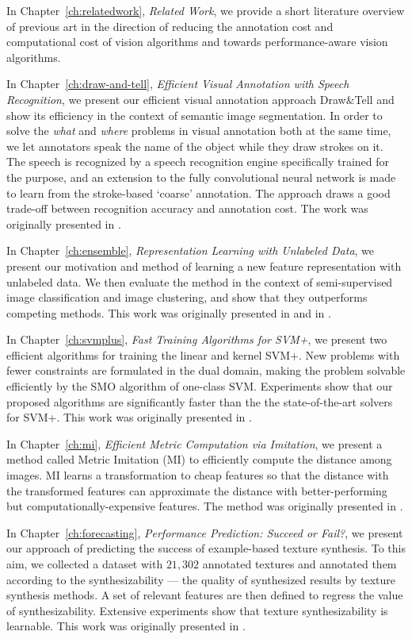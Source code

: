 In Chapter~\ref{ch:relatedwork}, \emph{Related Work}, we provide a short literature overview of previous art in the direction of  reducing the annotation cost and computational cost of vision algorithms and towards performance-aware vision algorithms. 

In Chapter~\ref{ch:draw-and-tell}, \emph{Efficient Visual Annotation with Speech Recognition}, we present our efficient visual annotation approach Draw\&Tell and show its efficiency in the context of semantic image segmentation. In order to solve the \emph{what} and \emph{where} problems in visual annotation both at the same time, we let annotators speak the name of the object  while they draw strokes on it.  The speech is recognized by a speech recognition engine specifically trained for the purpose, and an extension to the fully convolutional neural network is made to learn from the stroke-based `coarse' annotation.  The approach draws a good trade-off between recognition accuracy and annotation cost.  The work was originally presented in \citep{draw:tell}. 

In Chapter~\ref{ch:ensemble}, \emph{Representation Learning with Unlabeled Data}, we present our motivation and method of learning a new feature representation with unlabeled data.  We then evaluate the method in the context of semi-supervised image classification and image clustering, and show that they outperforms competing methods.    This work was originally presented in \citep{dai:eccv12b} and in \citep{dai:iccv13b}. 


In Chapter~\ref{ch:svmplus}, \emph{Fast Training Algorithms for SVM+}, we present two efficient algorithms
  for training the linear and kernel SVM+.  New problems with fewer constraints are formulated in the dual domain, making the problem solvable  efficiently by the SMO algorithm of one-class SVM.  Experiments show that our proposed algorithms are significantly faster than the  the state-of-the-art solvers for SVM+.    This work was originally presented in \citep{fastsvm+2016}. 
  
  
 In Chapter~\ref{ch:mi}, \emph{Efficient Metric Computation via Imitation}, we present a method called Metric Imitation (MI) to efficiently compute the distance among images.  MI learns a transformation to cheap features so that the distance with the transformed features can approximate the distance with better-performing but computationally-expensive features.  
The method was originally presented in \citep{metric:imitation}. 
 
In Chapter~\ref{ch:forecasting}, \emph{Performance Prediction: Succeed or Fail?}, we present our approach of predicting the success of example-based texture synthesis.  To this aim, we collected a dataset with  $21,302$ annotated textures and annotated them  according to the synthesizability --- the quality of synthesized results by texture synthesis methods. A set of relevant features are then defined to regress the value of synthesizability. Extensive experiments show that texture synthesizability is learnable. 
This work was originally presented in \citep{dai:synthesizability}. 


